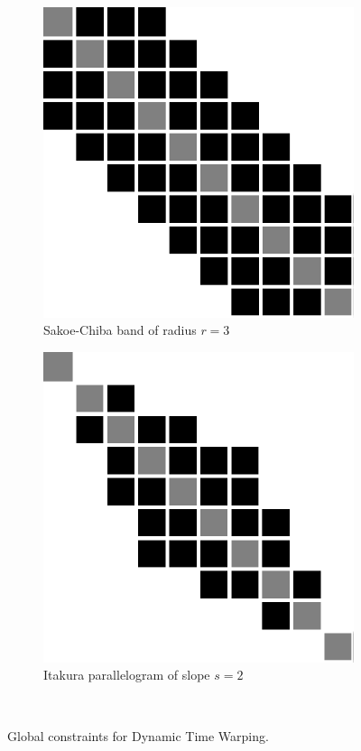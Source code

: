 \begin{figure}[t]
    ~~~~~~~~~
    \begin{subfigure}[b]{0.35\textwidth}
         \centering
         \includegraphics[width=\textwidth]{fig/sakoe}
         \caption{Sakoe-Chiba band of radius $r=3$}
         \label{fig:sakoe}
     \end{subfigure}
     \hfill
     \begin{subfigure}[b]{0.35\textwidth}
          \centering
          \includegraphics[width=\textwidth]{fig/itakura}
          \caption{Itakura parallelogram of slope $s=2$}
          \label{fig:itakura}
      \end{subfigure}
      ~~~~~~~~~
    \caption{Global constraints for Dynamic Time Warping.}
\end{figure}




